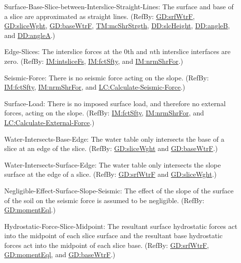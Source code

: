 \documentclass[12pt]{article}
\begin{document}
\begin{itemize}
\item[Surface-Base-Slice-between-Interslice-Straight-Lines:\phantomsection\label{assumpSBSBISL}]{The surface and base of a slice are approximated as straight lines. (RefBy: \hyperref[GD:srfWtrF]{GD:srfWtrF}, \hyperref[GD:sliceWght]{GD:sliceWght}, \hyperref[GD:baseWtrF]{GD:baseWtrF}, \hyperref[TM:mcShrStrgth]{TM:mcShrStrgth}, \hyperref[DD:slcHeight]{DD:slcHeight}, \hyperref[DD:angleB]{DD:angleB}, and \hyperref[DD:angleA]{DD:angleA}.)}
\item[Edge-Slices:\phantomsection\label{assumpES}]{The interslice forces at the 0th and $n$th interslice interfaces are zero. (RefBy: \hyperref[IM:intsliceFs]{IM:intsliceFs}, \hyperref[IM:fctSfty]{IM:fctSfty}, and \hyperref[IM:nrmShrFor]{IM:nrmShrFor}.)}
\item[Seismic-Force:\phantomsection\label{assumpSF}]{There is no seismic force acting on the slope. (RefBy: \hyperref[IM:fctSfty]{IM:fctSfty}, \hyperref[IM:nrmShrFor]{IM:nrmShrFor}, and \hyperref[LC_seismic]{LC:Calculate-Seismic-Force}.)}
\item[Surface-Load:\phantomsection\label{assumpSL}]{There is no imposed surface load, and therefore no external forces, acting on the slope. (RefBy: \hyperref[IM:fctSfty]{IM:fctSfty}, \hyperref[IM:nrmShrFor]{IM:nrmShrFor}, and \hyperref[LC_external]{LC:Calculate-External-Force}.)}
\item[Water-Intersects-Base-Edge:\phantomsection\label{assumpWIBE}]{The water table only intersects the base of a slice at an edge of the slice. (RefBy: \hyperref[GD:sliceWght]{GD:sliceWght} and \hyperref[GD:baseWtrF]{GD:baseWtrF}.)}
\item[Water-Intersects-Surface-Edge:\phantomsection\label{assumpWISE}]{The water table only intersects the slope surface at the edge of a slice. (RefBy: \hyperref[GD:srfWtrF]{GD:srfWtrF} and \hyperref[GD:sliceWght]{GD:sliceWght}.)}
\item[Negligible-Effect-Surface-Slope-Seismic:\phantomsection\label{assumpNESSS}]{The effect of the slope of the surface of the soil on the seismic force is assumed to be negligible. (RefBy: \hyperref[GD:momentEql]{GD:momentEql}.)}
\item[Hydrostatic-Force-Slice-Midpoint:\phantomsection\label{assumpHFSM}]{The resultant surface hydrostatic forces act into the midpoint of each slice surface and the resultant base hydrostatic forces act into the midpoint of each slice base. (RefBy: \hyperref[GD:srfWtrF]{GD:srfWtrF}, \hyperref[GD:momentEql]{GD:momentEql}, and \hyperref[GD:baseWtrF]{GD:baseWtrF}.)}
\end{itemize}
\end{document}
